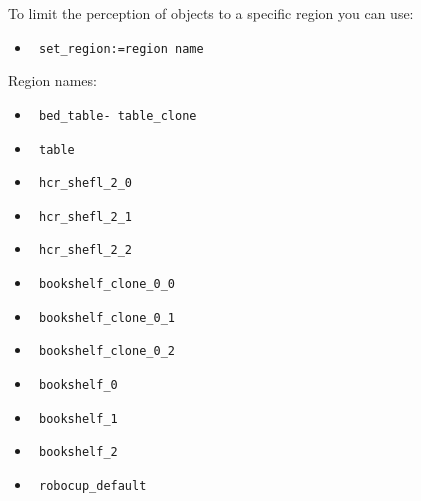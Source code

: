 \documentclass[main.tex]{subfiles}
\begin{document}
To limit the perception of objects to a specific region you can use:
\begin{itemize}
\item \begin{verbatim} set_region:=region name \end{verbatim} 
\end{itemize}
Region names:
\begin{itemize}
\item \begin{verbatim} bed_table- table_clone \end{verbatim} 
\item \begin{verbatim} table \end{verbatim} 
\item \begin{verbatim} hcr_shefl_2_0 \end{verbatim} 
\item \begin{verbatim} hcr_shefl_2_1 \end{verbatim}
\item \begin{verbatim} hcr_shefl_2_2 \end{verbatim}
\item \begin{verbatim} bookshelf_clone_0_0 \end{verbatim} 
\item \begin{verbatim} bookshelf_clone_0_1 \end{verbatim} 
\item \begin{verbatim} bookshelf_clone_0_2 \end{verbatim} 
\item \begin{verbatim} bookshelf_0 \end{verbatim} 
\item \begin{verbatim} bookshelf_1 \end{verbatim} 
\item \begin{verbatim} bookshelf_2 \end{verbatim} 
\item \begin{verbatim} robocup_default \end{verbatim} 
\end{itemize}
\end{document}
